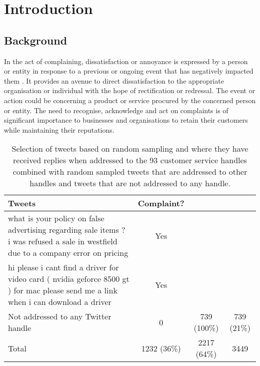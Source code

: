 \chapter{Introduction}

\section{Background}
In the act of complaining, dissatisfaction or annoyance is expressed by a person or entity in response to a previous or ongoing event that has negatively impacted them \cite{olshtain_speechact_1987}. It provides an avenue to direct dissatisfaction to the appropriate organisation or individual with the hope of rectification or redressal. The event or action could be concerning a product or service procured by the concerned person or entity. The need to recognise, acknowledge and act on complaints is of significant importance to businesses and organisations to retain their customers while maintaining their reputations.

\begin{table}[ht]
    \centering
    \begin{tabularx}{\textwidth}{|X|c|c|c|}
        \hline
        \rowcolor[gray]{0.7}
        \textbf{Tweets} & \textbf{Complaint?} \\
        \hline
        what is your policy on false advertising regarding sale items ? i was refused a sale in westfield due to a company error on pricing & Yes \\
        \hline
        hi please i cant find a driver for video card ( nvidia geforce 8500 gt ) for mac please send me a link when i can download a driver & Yes \\
        \hline
        Not addressed to any Twitter handle & 0 & 739 \small{(100\%)} & 739 \small{(21\%)}  \\
        \hline    
        \rowcolor[gray]{0.9}
        Total & 1232 \small{(36\%)}  & 2217 \small{(64\%)}  & 3449 \\
        \hline
    \end{tabularx}
    \caption{Selection of tweets based on random sampling and where they have received replies when addressed to the 93 customer service handles combined with random sampled tweets that are addressed to other handles and tweets that are not addressed to any handle.}    
    \label{tab: tweet_counts}
\end{table}  


